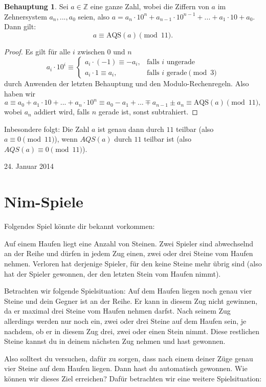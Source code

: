 \documentclass[a4paper,ngerman,12pt]{scrartcl}
\newcommand{\Z}{\mathbb{Z}}
\newcommand{\datum}[1]{\hfill {#1}\\}
\theoremstyle{definition}
\newtheorem{satz}{Behauptung}
\begin{document}
\begin{satz}
  Sei $a \in \Z$ eine ganze Zahl, wobei die Ziffern von $a$ im Zehnersystem $a_n, ..., a_0$ seien, also $a = a_n \cdot 10^n + a_{n-1} \cdot 10^{n-1} + ... + a_1 \cdot 10 + a_0$. Dann gilt:
  \[ a \equiv \mathrm{AQS}(a) \pmod{11}. \]
\end{satz}

\begin{proof}
  Es gilt für alle $i$ zwischen $0$ und $n$
  \[ a_i \cdot 10^i \equiv \begin{cases} a_i \cdot (-1) \equiv -a_i, & \text{falls $i$ ungerade} \\ a_i \cdot 1 \equiv a_i, & \text{falls $i$ gerade} \pmod{3} \end{cases} \]
  durch Anwenden der letzten Behauptung und den Modulo-Rechenregeln. Also haben wir
  \[ a \equiv a_0 + a_1 \cdot 10 + ... + a_n \cdot 10^n \equiv a_0 - a_1 + ... \mp a_{n-1} \pm a_n \equiv \mathrm{AQS}(a) \pmod{11}, \]
  wobei $a_n$ addiert wird, falls $n$ gerade ist, sonst subtrahiert.
\end{proof}

Inbesondere folgt: Die Zahl $a$ ist genau dann durch $11$ teilbar (also $a \equiv 0 \pmod{11}$), wenn $AQS(a)$ durch $11$ teilbar ist (also $AQS(a) \equiv 0 \pmod{11}$).

\datum{24. Januar 2014}

\section{Nim-Spiele}

Folgendes Spiel könnte dir bekannt vorkommen:

Auf einem Haufen liegt eine Anzahl von Steinen. Zwei Spieler sind abwechselnd an der Reihe und dürfen in jedem Zug einen, zwei oder drei Steine vom Haufen nehmen. Verloren hat derjenige Spieler, für den keine Steine mehr übrig sind (also hat der Spieler gewonnen, der den letzten Stein vom Haufen nimmt).

Betrachten wir folgende Spielsituation: Auf dem Haufen liegen noch genau vier Steine und dein Gegner ist an der Reihe. Er kann in diesem Zug nicht gewinnen, da er maximal drei Steine vom Haufen nehmen darfst. Nach seinem Zug allerdings werden nur noch ein, zwei oder drei Steine auf dem Haufen sein, je nachdem, ob er in diesem Zug drei, zwei oder einen Stein nimmt. Diese restlichen Steine kannst du in deinem nächsten Zug nehmen und hast gewonnen.

Also solltest du versuchen, dafür zu sorgen, dass nach einem deiner Züge genau vier Steine auf dem Haufen liegen. Dann hast du automatisch gewonnen. Wie können wir dieses Ziel erreichen? Dafür betrachten wir eine weitere Spielsituation:
\end{document}
